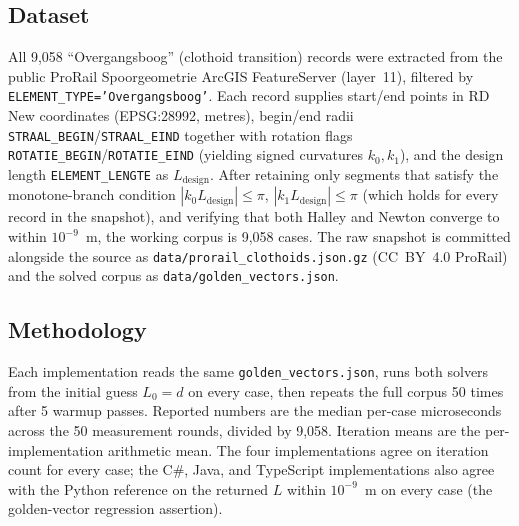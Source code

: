 \documentclass[11pt,a4paper]{article}
\begin{document}
\subsection{Dataset}
All 9{,}058 ``Overgangsboog'' (clothoid transition) records were extracted from the public ProRail Spoorgeometrie ArcGIS FeatureServer (layer~11), filtered by \texttt{ELEMENT\_TYPE='Overgangsboog'}. Each record supplies start/end points in RD New coordinates (EPSG:28992, metres), begin/end radii \texttt{STRAAL\_BEGIN}/\texttt{STRAAL\_EIND} together with rotation flags \texttt{ROTATIE\_BEGIN}/\texttt{ROTATIE\_EIND} (yielding signed curvatures $k_0,k_1$), and the design length \texttt{ELEMENT\_LENGTE} as $L_{\text{design}}$. After retaining only segments that satisfy the monotone-branch condition $|k_0 L_{\text{design}}| \le \pi$, $|k_1 L_{\text{design}}| \le \pi$ (which holds for every record in the snapshot), and verifying that both Halley and Newton converge to within $10^{-9}$~m, the working corpus is 9{,}058 cases. The raw snapshot is committed alongside the source as \texttt{data/prorail\_clothoids.json.gz} (CC~BY~4.0 ProRail) and the solved corpus as \texttt{data/golden\_vectors.json}.

\subsection{Methodology}
Each implementation reads the same \texttt{golden\_vectors.json}, runs both solvers from the initial guess $L_0 = d$ on every case, then repeats the full corpus 50 times after 5 warmup passes. Reported numbers are the median per-case microseconds across the 50 measurement rounds, divided by 9{,}058. Iteration means are the per-implementation arithmetic mean. The four implementations agree on iteration count for every case; the C\#, Java, and TypeScript implementations also agree with the Python reference on the returned $L$ within $10^{-9}$~m on every case (the golden-vector regression assertion).
\end{document}
